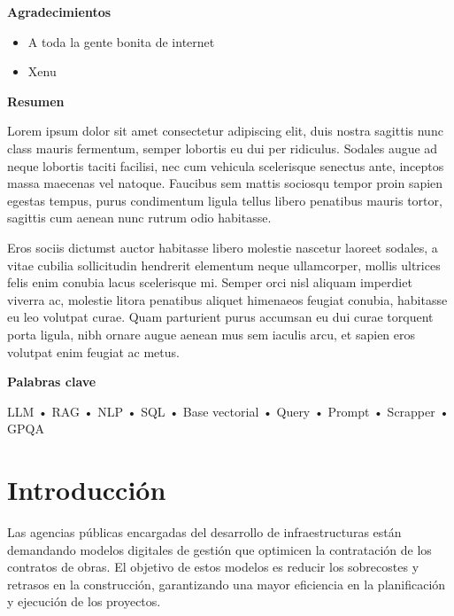 \documentclass{article}
\begin{document}
{\bfseries\LARGE Agradecimientos \par}
\begin{itemize}
  \item A toda la gente bonita de internet
  \item Xenu
\end{itemize}
\newpage

{\bfseries\LARGE Resumen \par}
Lorem ipsum dolor sit amet consectetur adipiscing elit, duis nostra sagittis nunc class mauris fermentum, semper lobortis eu dui per ridiculus. Sodales augue ad neque lobortis taciti facilisi, nec cum vehicula scelerisque senectus ante, inceptos massa maecenas vel natoque. Faucibus sem mattis sociosqu tempor proin sapien egestas tempus, purus condimentum ligula tellus libero penatibus mauris tortor, sagittis cum aenean nunc rutrum odio habitasse.

Eros sociis dictumst auctor habitasse libero molestie nascetur laoreet sodales, a vitae cubilia sollicitudin hendrerit elementum neque ullamcorper, mollis ultrices felis enim conubia lacus scelerisque mi. Semper orci nisl aliquam imperdiet viverra ac, molestie litora penatibus aliquet himenaeos feugiat conubia, habitasse eu leo volutpat curae. Quam parturient purus accumsan eu dui curae torquent porta ligula, nibh ornare augue aenean mus sem iaculis arcu, et sapien eros volutpat enim feugiat ac metus.

\vspace{1cm}

{\bfseries Palabras clave \par}
\vspace{0.25cm}
LLM • RAG • NLP • SQL • Base vectorial • Query • Prompt • Scrapper • GPQA
\newpage

{\Large %
\tableofcontents
}\newpage


\section{Introducción}
Las agencias públicas encargadas del desarrollo de infraestructuras están demandando modelos digitales de gestión que optimicen la contratación de los contratos de obras. El objetivo de estos modelos es reducir los sobrecostes y retrasos en la construcción, garantizando una mayor eficiencia en la planificación y ejecución de los proyectos.
\end{document}
